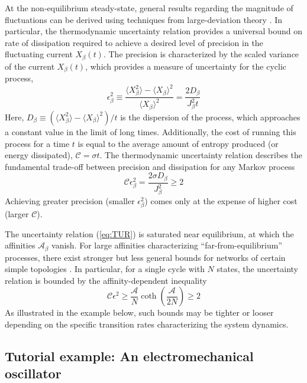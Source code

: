 \begin{appendices}
At the non-equilibrium steady-state, general results regarding the magnitude of fluctuations can be derived using techniques from large-deviation theory \autocite{Touchette2009}. In particular, the thermodynamic uncertainty relation \autocite{Barato2015,Gingrich2016} provides a universal bound on rate of dissipation required to achieve a desired level of precision in the fluctuating current $X_{\beta}(t)$. The precision is characterized by the scaled variance of the current $X_{\beta}(t)$, which provides a measure of uncertainty for the cyclic process,
\begin{equation}
    \epsilon^2_{\beta} \equiv \frac{\langle X_{\beta}^2 \rangle -\langle X_{\beta} \rangle^2 }{\langle X_{\beta} \rangle^2} = \frac{2 D_{\beta}}{J^2_{\beta} t}
\end{equation}
Here, $D_{\beta}\equiv ( \langle X_{\beta}^2 \rangle -\langle X_{\beta} \rangle^2) / t$ is the dispersion of the process, which approaches a constant value in the limit of long times.  Additionally, the cost of running this process for a time $t$ is equal to the average amount of entropy produced (or energy dissipated), $\mathcal{C} = \sigma t$. The thermodynamic uncertainty relation describes the fundamental trade-off between precision and dissipation for any Markov process
\begin{equation}
     \mathcal{C}\epsilon^2_{\beta} = \frac{2\sigma D_{\beta}}{J_{\beta}^2} \geq 2 \label{eq:TUR}
\end{equation}
Achieving greater precision (smaller $\epsilon_{\beta}^2$) comes only at the expense of higher cost (larger $\mathcal{C}$).  

The uncertainty relation (\ref{eq:TUR}) is saturated near equilibrium, at which the affinities $\mathcal{A}_{\beta}$ vanish. For large affinities characterizing ``far-from-equilibrium'' processes, there exist stronger but less general bounds for networks of certain simple topologies \autocite{Pietzonka2016b}.  In particular, for a single cycle with $N$ states, the uncertainty relation is bounded by the affinity-dependent inequality  
\begin{equation}
    \mathcal{C}\epsilon^2 \geq \frac{\mathcal{A}}{N}\coth\left(\frac{\mathcal{A}}{2N}\right) \geq 2 \label{eq:unicycle}
\end{equation}
As illustrated in the example below, such bounds may be tighter or looser depending on the specific transition rates characterizing the system dynamics. 

\subsection{Tutorial example: An electromechanical oscillator}


\end{appendices}
